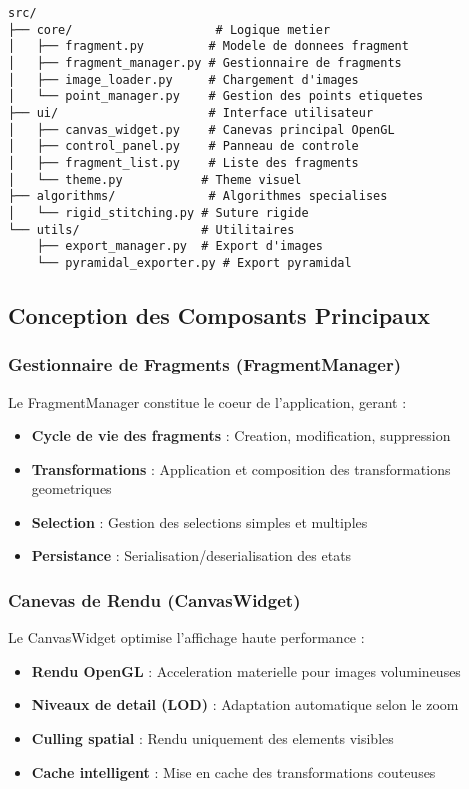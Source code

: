 \documentclass[12pt,a4paper]{article}
\begin{document}
\begin{verbatim}
src/
├── core/                    # Logique metier
│   ├── fragment.py         # Modele de donnees fragment
│   ├── fragment_manager.py # Gestionnaire de fragments
│   ├── image_loader.py     # Chargement d'images
│   └── point_manager.py    # Gestion des points etiquetes
├── ui/                     # Interface utilisateur
│   ├── canvas_widget.py    # Canevas principal OpenGL
│   ├── control_panel.py    # Panneau de controle
│   ├── fragment_list.py    # Liste des fragments
│   └── theme.py           # Theme visuel
├── algorithms/             # Algorithmes specialises
│   └── rigid_stitching.py # Suture rigide
└── utils/                 # Utilitaires
    ├── export_manager.py  # Export d'images
    └── pyramidal_exporter.py # Export pyramidal
\end{verbatim}

\subsection{Conception des Composants Principaux}

\subsubsection{Gestionnaire de Fragments (FragmentManager)}

Le FragmentManager constitue le coeur de l'application, gerant :

\begin{itemize}
\item \textbf{Cycle de vie des fragments} : Creation, modification, suppression
\item \textbf{Transformations} : Application et composition des transformations geometriques
\item \textbf{Selection} : Gestion des selections simples et multiples
\item \textbf{Persistance} : Serialisation/deserialisation des etats
\end{itemize}

\subsubsection{Canevas de Rendu (CanvasWidget)}

Le CanvasWidget optimise l'affichage haute performance :

\begin{itemize}
\item \textbf{Rendu OpenGL} : Acceleration materielle pour images volumineuses
\item \textbf{Niveaux de detail (LOD)} : Adaptation automatique selon le zoom
\item \textbf{Culling spatial} : Rendu uniquement des elements visibles
\item \textbf{Cache intelligent} : Mise en cache des transformations couteuses
\end{itemize}
\end{document}
